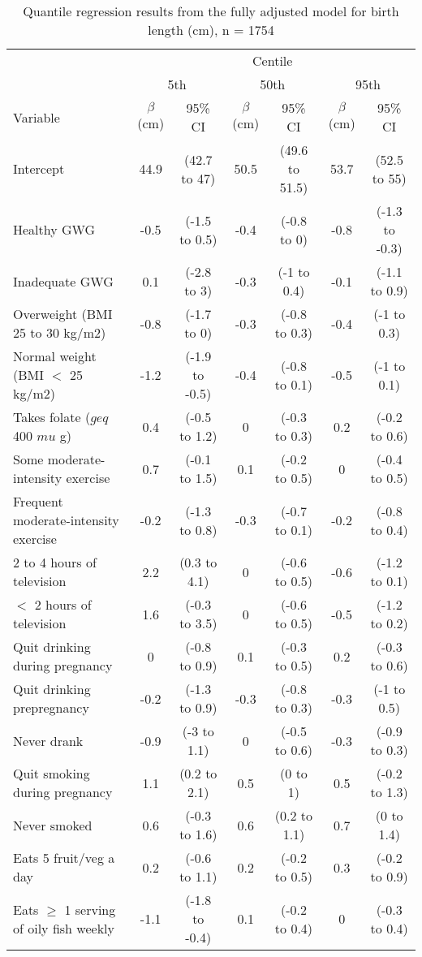 \documentclass[10pt]{article}
\begin{document}
\begin{landscape}
\begin{table}
\begin{threeparttable}
\caption {Quantile regression results from the fully adjusted model for birth length (cm), n = 1754}
\begin{tabular}{lcccccc} 
\toprule
& \multicolumn{6}{c}{Centile} \\
& \multicolumn{2}{c}{5th} &  \multicolumn{2}{c}{50th} &  \multicolumn{2}{c}{95th} \\ 
\cmidrule(lr){2-7}
Variable & $\beta$ (cm) & 95\% CI & $\beta$ (cm) & 95\% CI & $\beta$ (cm) & 95\% CI \\
\cmidrule(lr){2-3}
\cmidrule(lr){4-5}
\cmidrule(lr){6-7}
Intercept & 44.9 & (42.7 to 47) & 50.5 & (49.6 to 51.5) & 53.7 & (52.5 to 55)\\
Healthy GWG & -0.5 & (-1.5 to 0.5) & -0.4 & (-0.8 to 0) & -0.8 & (-1.3 to -0.3)\\
Inadequate GWG & 0.1 & (-2.8 to 3) & -0.3 & (-1 to 0.4) & -0.1 & (-1.1 to 0.9)\\
Overweight (BMI 25 to 30 kg/m2) & -0.8 & (-1.7 to 0) & -0.3 & (-0.8 to 0.3) & -0.4 & (-1 to 0.3)\\
Normal weight (BMI $<$ 25 kg/m2) & -1.2 & (-1.9 to -0.5) & -0.4 & (-0.8 to 0.1) & -0.5 & (-1 to 0.1)\\
Takes folate ($geq$ 400 $mu$ g) & 0.4 & (-0.5 to 1.2) & 0 & (-0.3 to 0.3) & 0.2 & (-0.2 to 0.6)\\
Some moderate-intensity exercise & 0.7 & (-0.1 to 1.5) & 0.1 & (-0.2 to 0.5) & 0 & (-0.4 to 0.5)\\
Frequent moderate-intensity exercise & -0.2 & (-1.3 to 0.8) & -0.3 & (-0.7 to 0.1) & -0.2 & (-0.8 to 0.4)\\
2 to 4 hours of television & 2.2 & (0.3 to 4.1) & 0 & (-0.6 to 0.5) & -0.6 & (-1.2 to 0.1)\\
$<$ 2 hours of television & 1.6 & (-0.3 to 3.5) & 0 & (-0.6 to 0.5) & -0.5 & (-1.2 to 0.2)\\
Quit drinking during pregnancy & 0 & (-0.8 to 0.9) & 0.1 & (-0.3 to 0.5) & 0.2 & (-0.3 to 0.6)\\
Quit drinking prepregnancy & -0.2 & (-1.3 to 0.9) & -0.3 & (-0.8 to 0.3) & -0.3 & (-1 to 0.5)\\
Never drank & -0.9 & (-3 to 1.1) & 0 & (-0.5 to 0.6) & -0.3 & (-0.9 to 0.3)\\
Quit smoking during pregnancy & 1.1 & (0.2 to 2.1) & 0.5 & (0 to 1) & 0.5 & (-0.2 to 1.3)\\
Never smoked & 0.6 & (-0.3 to 1.6) & 0.6 & (0.2 to 1.1) & 0.7 & (0 to 1.4)\\
Eats 5 fruit/veg a day & 0.2 & (-0.6 to 1.1) & 0.2 & (-0.2 to 0.5) & 0.3 & (-0.2 to 0.9)\\
Eats $\geq$ 1 serving of oily fish weekly & -1.1 & (-1.8 to -0.4) & 0.1 & (-0.2 to 0.4) & 0 & (-0.3 to 0.4)\\




\end{tabular}
\end{threeparttable}
\end{table}
\end{landscape}
\end{document}
